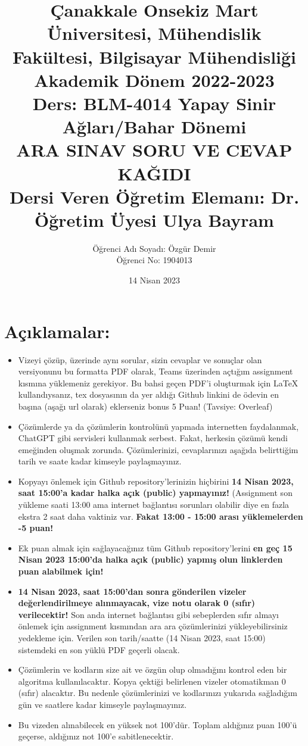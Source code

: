 \documentclass[11pt]{article}
\title{Çanakkale Onsekiz Mart Üniversitesi, Mühendislik Fakültesi, Bilgisayar Mühendisliği Akademik Dönem 2022-2023\\
Ders: BLM-4014 Yapay Sinir Ağları/Bahar Dönemi\\ 
ARA SINAV SORU VE CEVAP KAĞIDI\\
Dersi Veren Öğretim Elemanı: Dr. Öğretim Üyesi Ulya Bayram}
\author{%
\begin{minipage}{\textwidth}
\raggedright
Öğrenci Adı Soyadı: Özgür Demir\\ %
Öğrenci No: 1904013
\end{minipage}%
}
\date{14 Nisan 2023}
\begin{document}
\maketitle

\vspace{-.5in}
\section*{Açıklamalar:}
\begin{itemize}
    \item Vizeyi çözüp, üzerinde aynı sorular, sizin cevaplar ve sonuçlar olan versiyonunu bu formatta PDF olarak, Teams üzerinden açtığım assignment kısmına yüklemeniz gerekiyor. Bu bahsi geçen PDF'i oluşturmak için LaTeX kullandıysanız, tex dosyasının da yer aldığı Github linkini de ödevin en başına (aşağı url olarak) eklerseniz bonus 5 Puan! (Tavsiye: Overleaf)
    \item Çözümlerde ya da çözümlerin kontrolünü yapmada internetten faydalanmak, ChatGPT gibi servisleri kullanmak serbest. Fakat, herkesin çözümü kendi emeğinden oluşmak zorunda. Çözümlerinizi, cevaplarınızı aşağıda belirttiğim tarih ve saate kadar kimseyle paylaşmayınız. 
    \item Kopyayı önlemek için Github repository'lerinizin hiçbirini \textbf{14 Nisan 2023, saat 15:00'a kadar halka açık (public) yapmayınız!} (Assignment son yükleme saati 13:00 ama internet bağlantısı sorunları olabilir diye en fazla ekstra 2 saat daha vaktiniz var. \textbf{Fakat 13:00 - 15:00 arası yüklemelerden -5 puan!}
    \item Ek puan almak için sağlayacağınız tüm Github repository'lerini \textbf{en geç 15 Nisan 2023 15:00'da halka açık (public) yapmış olun linklerden puan alabilmek için!}
    \item \textbf{14 Nisan 2023, saat 15:00'dan sonra gönderilen vizeler değerlendirilmeye alınmayacak, vize notu olarak 0 (sıfır) verilecektir!} Son anda internet bağlantısı gibi sebeplerden sıfır almayı önlemek için assignment kısmından ara ara çözümlerinizi yükleyebilirsiniz yedekleme için. Verilen son tarih/saatte (14 Nisan 2023, saat 15:00) sistemdeki en son yüklü PDF geçerli olacak.
    \item Çözümlerin ve kodların size ait ve özgün olup olmadığını kontrol eden bir algoritma kullanılacaktır. Kopya çektiği belirlenen vizeler otomatikman 0 (sıfır) alacaktır. Bu nedenle çözümlerinizi ve kodlarınızı yukarıda sağladığım gün ve saatlere kadar kimseyle paylaşmayınız.
    \item Bu vizeden alınabilecek en yüksek not 100'dür. Toplam aldığınız puan 100'ü geçerse, aldığınız not 100'e sabitlenecektir.

\end{itemize}
\end{document}
